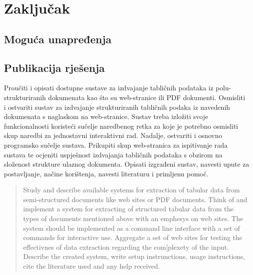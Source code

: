 \documentclass[times, utf8, zavrsni]{fer}
\begin{document}
\chapter{Zaključak}

\section{Moguća unapređenja}

\section{Publikacija rješenja}






\begin{sazetak}

Proučiti i opisati dostupne sustave za izdvajanje tabličnih podataka iz
polu-strukturiranih dokumenata kao što su web-stranice ili PDF dokumenti.
Osmisliti i ostvariti sustav za izdvajanje strukturiranih tabličnih podaka iz
navedenih dokumenata s naglaskom na web-stranice.
Sustav treba izložiti svoje funkcionalnosti koristeći sučelje naredbenog retka
za koje je potrebno osmisliti skup naredbi za jednostavni interaktivni rad.
Nadalje, ostvariti i osnovno programsko sučelje sustava. Prikupiti skup
web-stranica za ispitivanje rada sustava te ocjeniti uspješnost izdvajanja
tabličnih podataka s obzirom na složenost strukture ulaznog dokumenta. Opisati
izgrađeni sustav, navesti upute za postavljanje, načine korištenja, navesti
literaturu i primljenu pomoć.

\kljucnerijeci{}
\end{sazetak}

\begin{abstract}

Study and describe available systems for extraction of tabular data from
semi-structured documents like web sites or PDF documents. Think of and
implement a system for extracting of structured tabular data from the types of
documents mentioned above with an emphesys on web sites.
The system should be implemented as a command line interface with a set of
commands for interactive use. Aggregate a set of web sites for testing the
effectivnes of data extraction regarding the com[plexety of the input.
Describe the created system, write setup instrunctions, usage instructions,
cite the literature used and any help received.

\keywords{}
\end{abstract}
\end{document}
